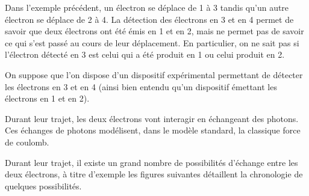 \begin{minipage}[c]{.45\linewidth}

Dans l'exemple précédent, un électron se déplace de 1 à 3 tandis qu'un autre électron se déplace de 2 à 4. La détection des électrons en 3 et en 4 permet de savoir que deux électrons ont été émis en 1 et en 2, mais ne permet pas de savoir ce qui s'est passé au cours de leur déplacement. En particulier, on ne sait pas si l'électron détecté en 3 est celui qui a été produit en 1 ou celui produit en 2.



\end{minipage}
\hfill
\begin{minipage}[c]{.45\linewidth}
\end{minipage}

\vspace{0.9cm}
On suppose que l'on dispose d'un dispositif expérimental permettant de détecter les électrons en 3 et en 4 (ainsi bien entendu qu'un dispositif émettant les électrons en 1 et en 2). 

Durant leur trajet, les deux électrons vont interagir en échangeant des photons. Ces échanges de photons modélisent, dans le modèle standard, la classique force de coulomb.

Durant leur trajet, il existe un grand nombre de possibilités d'échange entre les deux électrons, à titre d'exemple les figures suivantes détaillent la chronologie de quelques possibilités.

